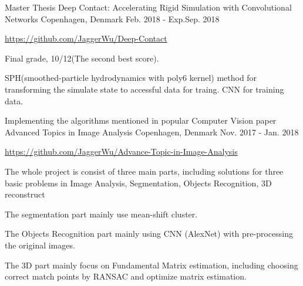 \begin{cventries}
  \cventry
    {Master Thesis}
    {Deep Contact: Accelerating Rigid Simulation with Convolutional Networks}
    {Copenhagen, Denmark}
    {Feb. 2018 - Exp.Sep. 2018}
    {
      \begin{cvitems}
        \item {\url{https://github.com/JaggerWu/Deep-Contact}}
	\item Final grade, 10/12(The second best score). 
	\item SPH(smoothed-particle hydrodynamics with poly6 kernel) method for transforming the simulate state to accessful data for traing. CNN for training data.
      \end{cvitems}
    }
 \cventry
    {Implementing the algorithms mentioned in popular Computer Vision paper}
    {Advanced Topics in Image Analysis}
    {Copenhagen, Denmark}
    {Nov. 2017 - Jan. 2018}
    {
      \begin{cvitems}
        \item {\url{https://github.com/JaggerWu/Advance-Topic-in-Image-Analysis}}
        \item {The whole project is consist of three main parts, including solutions for three basic problems in Image Analysis, Segmentation, Objects Recognition, 3D reconstruct}
        \item {The segmentation part mainly use mean-shift cluster.}
        \item {The Objects Recognition part mainly using CNN (AlexNet) with pre-processing the original images.}
        \item {The 3D part mainly focus on Fundamental Matrix estimation, including choosing correct match points by RANSAC and optimize matrix estimation.}
      \end{cvitems}
    }
  \cventry

\end{cventries}
